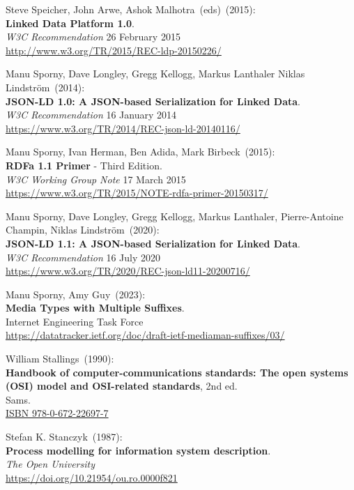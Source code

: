 \begin{thebibliography}{9}
Steve Speicher, John Arwe, Ashok Malhotra~(eds)~(2015): \\
\textbf{Linked Data Platform 1.0}.\\ 
\emph{W3C Recommendation} 26 February 2015\\
\url{http://www.w3.org/TR/2015/REC-ldp-20150226/}

Manu Sporny, Dave Longley,  Gregg Kellogg,  Markus Lanthaler Niklas Lindström~(2014): \\
\textbf{JSON-LD 1.0: A JSON-based Serialization for Linked Data}.\\
\emph{W3C Recommendation} 16 January 2014\\
\url{https://www.w3.org/TR/2014/REC-json-ld-20140116/}

Manu Sporny, Ivan Herman, Ben Adida, Mark Birbeck~(2015): \\
\textbf{RDFa 1.1 Primer} - Third Edition. \\
\emph{W3C Working Group Note} 17 March 2015 \\
\url{https://www.w3.org/TR/2015/NOTE-rdfa-primer-20150317/}

Manu Sporny, Dave Longley, Gregg Kellogg, Markus Lanthaler, Pierre-Antoine Champin, Niklas Lindström~(2020): \\
\textbf{JSON-LD 1.1: A JSON-based Serialization for Linked Data}.\\
\emph{W3C Recommendation} 16 July 2020\\
\url{https://www.w3.org/TR/2020/REC-json-ld11-20200716/}

Manu Sporny, Amy Guy~(2023): \\
\textbf{{Media Types with Multiple Suffixes}}.\\
Internet Engineering Task Force\\
\url{https://datatracker.ietf.org/doc/draft-ietf-mediaman-suffixes/03/}
 
William Stallings~(1990): \\
\textbf{Handbook of computer-communications standards: {The} open systems ({OSI}) model and {OSI-related} standards}, 2nd ed. \\
Sams.\\
\href{https://identifiers.org/isbn/9780672226977}{ISBN 978-0-672-22697-7}
 
Stefan K. Stanczyk~(1987): \\
\textbf{Process modelling for information system description}.\\
\emph{The Open University} \\
\url{https://doi.org/10.21954/ou.ro.0000f821}


\end{thebibliography}
